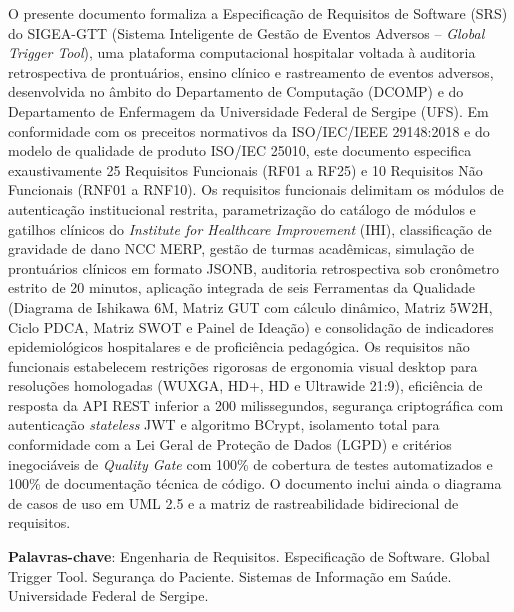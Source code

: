 \begin{resumo}
O presente documento formaliza a Especificação de Requisitos de Software (SRS) do SIGEA-GTT (Sistema Inteligente de Gestão de Eventos Adversos -- \textit{Global Trigger Tool}), uma plataforma computacional hospitalar voltada à auditoria retrospectiva de prontuários, ensino clínico e rastreamento de eventos adversos, desenvolvida no âmbito do Departamento de Computação (DCOMP) e do Departamento de Enfermagem da Universidade Federal de Sergipe (UFS). Em conformidade com os preceitos normativos da ISO/IEC/IEEE 29148:2018 e do modelo de qualidade de produto ISO/IEC 25010, este documento especifica exaustivamente 25 Requisitos Funcionais (RF01 a RF25) e 10 Requisitos Não Funcionais (RNF01 a RNF10). Os requisitos funcionais delimitam os módulos de autenticação institucional restrita, parametrização do catálogo de módulos e gatilhos clínicos do \textit{Institute for Healthcare Improvement} (IHI), classificação de gravidade de dano NCC MERP, gestão de turmas acadêmicas, simulação de prontuários clínicos em formato JSONB, auditoria retrospectiva sob cronômetro estrito de 20 minutos, aplicação integrada de seis Ferramentas da Qualidade (Diagrama de Ishikawa 6M, Matriz GUT com cálculo dinâmico, Matriz 5W2H, Ciclo PDCA, Matriz SWOT e Painel de Ideação) e consolidação de indicadores epidemiológicos hospitalares e de proficiência pedagógica. Os requisitos não funcionais estabelecem restrições rigorosas de ergonomia visual desktop para resoluções homologadas (WUXGA, HD+, HD e Ultrawide 21:9), eficiência de resposta da API REST inferior a 200 milissegundos, segurança criptográfica com autenticação \textit{stateless} JWT e algoritmo BCrypt, isolamento total para conformidade com a Lei Geral de Proteção de Dados (LGPD) e critérios inegociáveis de \textit{Quality Gate} com 100\% de cobertura de testes automatizados e 100\% de documentação técnica de código. O documento inclui ainda o diagrama de casos de uso em UML 2.5 e a matriz de rastreabilidade bidirecional de requisitos.

\vspace{\onelineskip}
\noindent
\textbf{Palavras-chave}: Engenharia de Requisitos. Especificação de Software. Global Trigger Tool. Segurança do Paciente. Sistemas de Informação em Saúde. Universidade Federal de Sergipe.
\end{resumo}
